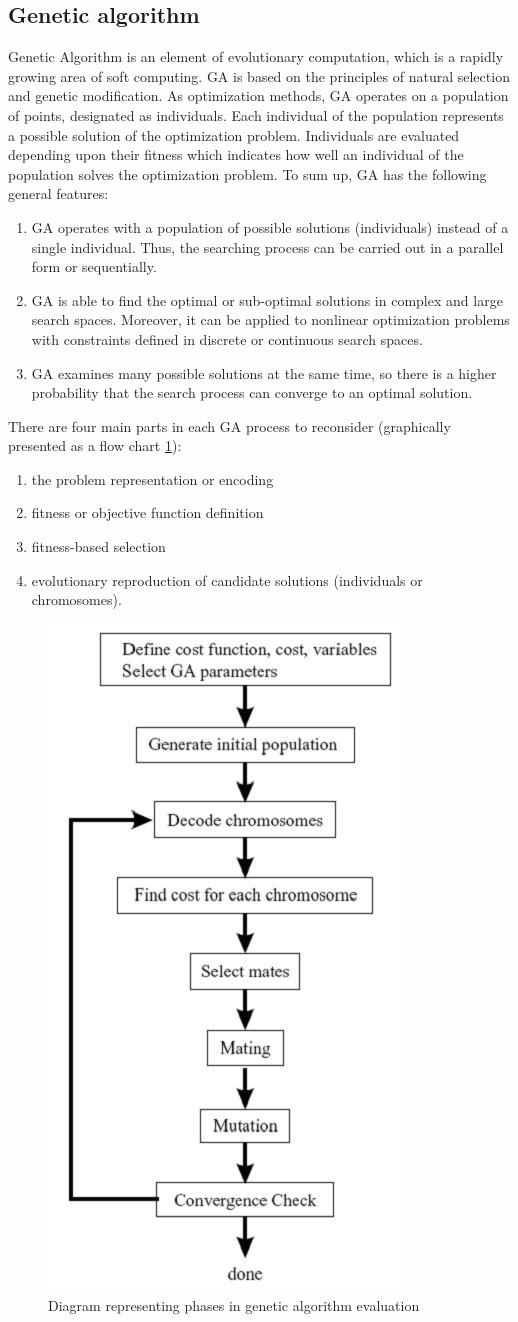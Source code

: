 \subsection{Genetic algorithm}
\label{cha:Genetic_algorithm}
Genetic Algorithm is an element of evolutionary computation, which is a 
rapidly growing area of soft computing. GA is based on the principles of
natural selection and genetic modification. As optimization methods, GA 
operates on a population of points, designated as individuals. Each 
individual of the population represents a possible solution of the 
optimization problem. Individuals are evaluated depending upon their 
fitness which indicates how well an individual of the population solves 
the optimization problem. To sum up, GA has the following general features:
\begin{enumerate}
    \item GA operates with a population of possible solutions (individuals) 
        instead of a single individual. Thus, the searching process can be 
        carried out in a parallel form or sequentially.
    \item GA is able to find the optimal or sub-optimal solutions in complex
        and large search spaces. Moreover, it can be applied to nonlinear 
        optimization problems with constraints defined in discrete or continuous 
        search spaces.
    \item GA examines many possible solutions at the same time, so there is a 
        higher probability that the search process can converge to an optimal solution.
\end{enumerate}
There are four main parts in each GA process to reconsider (graphically
presented as a flow chart \ref{fig:genetic_scheme}):
\begin{enumerate}
    \item the problem representation or encoding
    \item fitness or objective function definition
    \item fitness-based selection
    \item evolutionary reproduction of candidate solutions (individuals or chromosomes). 
\end{enumerate}
\begin{figure}[H]
    \begin{center}
        \includegraphics[height=0.5\textwidth]{fig/genetic.png}
    \end{center}
    \caption{Diagram representing phases in genetic algorithm evaluation}
    \label{fig:genetic_scheme}
\end{figure}

